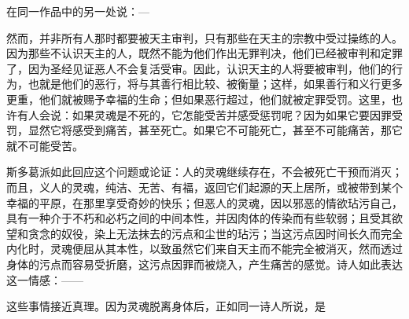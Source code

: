 \par

在同一作品中的另一处说：—\par

\par

然而，并非所有人那时都要被天主审判，只有那些在天主的宗教中受过操练的人。因为那些不认识天主的人，既然不能为他们作出无罪判决，他们已经被审判和定罪了，因为圣经见证恶人不会复活受审。因此，认识天主的人将要被审判，他们的行为，也就是他们的恶行，将与其善行相比较、被衡量；这样，如果善行和义行更多更重，他们就被赐予幸福的生命；但如果恶行超过，他们就被定罪受罚。这里，也许有人会说：如果灵魂是不死的，它怎能受苦并感受惩罚呢？因为如果它要因罪受罚，显然它将感受到痛苦，甚至死亡。如果它不可能死亡，甚至不可能痛苦，那它就不可能受苦。\par

斯多葛派如此回应这个问题或论证：人的灵魂继续存在，不会被死亡干预而消灭；而且，义人的灵魂，纯洁、无苦、有福，返回它们起源的天上居所，或被带到某个幸福的平原，在那里享受奇妙的快乐；但恶人的灵魂，因以邪恶的情欲玷污自己，具有一种介于不朽和必朽之间的中间本性，并因肉体的传染而有些软弱；且受其欲望和贪念的奴役，染上无法抹去的污点和尘世的玷污；当这污点因时间长久而完全内化时，灵魂便屈从其本性，以致虽然它们来自天主而不能完全被消灭，然而透过身体的污点而容易受折磨，这污点因罪而被烧入，产生痛苦的感觉。诗人如此表达这一情感：——\par

\par

这些事情接近真理。因为灵魂脱离身体后，正如同一诗人所说，是\par

\par

